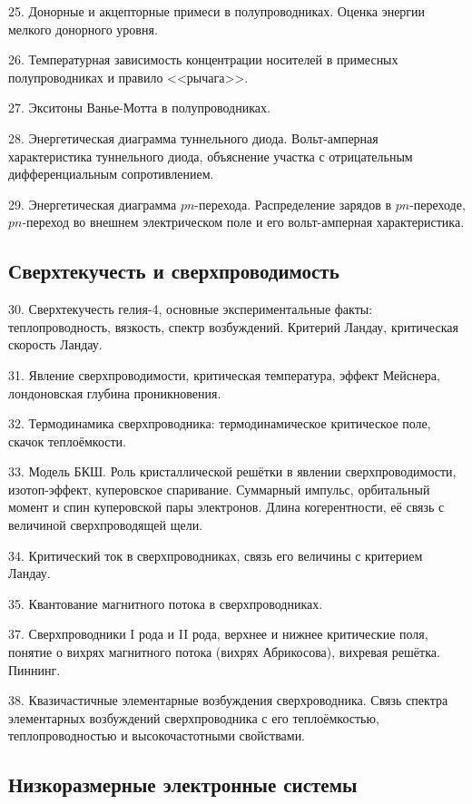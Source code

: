 25. Донорные и акцепторные примеси в полупроводниках. Оценка энергии мелкого донорного уровня.

26. Температурная зависимость концентрации носителей в примесных полупроводниках и правило <<рычага>>.

27. Экситоны Ванье-Мотта в полупроводниках.

28. Энергетическая диаграмма туннельного диода. Вольт-амперная характеристика туннельного диода, объяснение участка с отрицательным дифференциальным сопротивлением.

29. Энергетическая диаграмма $pn$-перехода. Распределение зарядов в $pn$-переходе, $pn$-переход во внешнем электрическом поле и его вольт-амперная характеристика.





\subsection*{Сверхтекучесть и сверхпроводимость}

30. Сверхтекучесть гелия-4, основные экспериментальные факты: теплопроводность, вязкость, спектр возбуждений. Критерий Ландау, критическая скорость Ландау.

31. Явление сверхпроводимости, критическая температура, эффект Мейснера, лондоновская глубина проникновения.

32. Термодинамика сверхпроводника: термодинамическое критическое поле, скачок теплоёмкости.

33. Модель БКШ. Роль кристаллической решётки в явлении сверхпроводимости, изотоп-эффект, куперовское спаривание. Суммарный импульс, орбитальный момент и спин куперовской пары электронов. Длина когерентности, её связь с величиной сверхпроводящей щели.

34. Критический ток в сверхпроводниках, связь его величины с критерием Ландау.

35. Квантование магнитного потока в сверхпроводниках.

37. Сверхпроводники I рода и II рода, верхнее и нижнее критические поля, понятие о вихрях магнитного потока (вихрях Абрикосова), вихревая решётка. Пиннинг.

38. Квазичастичные элементарные возбуждения сверхроводника. Связь спектра элементарных возбуждений сверхпроводника с его теплоёмкостью, теплопроводностью и высокочастотными свойствами.



\subsection*{Низкоразмерные электронные системы}

